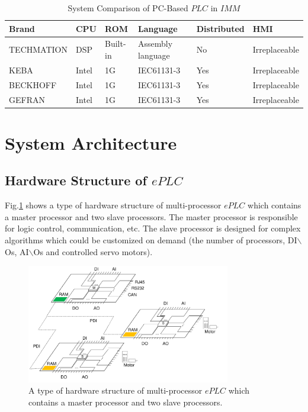 \documentclass[journal,UTF8]{IEEEtran}
\begin{document}
\begin{table}
	\scriptsize \caption{System Comparison of PC-Based $PLC$ in $IMM$}
	\label{table:IMMControllor}
	\begin{center}
		\renewcommand{\arraystretch}{1.4}
		\setlength\tabcolsep{3pt}
		\begin{tabular}{|p{1.6cm}|p{0.5cm}|p{0.8cm}|p{2cm}|p{1.1cm}|p{1.3cm}|}
			\hline
			Brand       & CPU    & ROM & Language       & Distributed  & HMI\\
			\hline
			TECHMATION  & DSP    & Built-in  & Assembly language        &No  & Irreplaceable \\
			\hline
			KEBA        & Intel  & 1G  & IEC61131-3                 &Yes    & Irreplaceable\\
			\hline
			BECKHOFF    & Intel  & 1G  & IEC61131-3               &Yes   &Irreplaceable\\
			\hline
			GEFRAN      & Intel  & 1G  &IEC61131-3                 &Yes   &Irreplaceable\\
			\hline
		\end{tabular}
	\end{center}
\end{table}
\section{System Architecture}
\label{MultiProcessorePLC}
\subsection{Hardware Structure of $ePLC$}
Fig.\ref{fig:HardwareStructure} shows a type of hardware structure of multi-processor $ePLC$ which contains a master processor and two slave processors. The master processor is responsible for logic control, communication, etc. The slave processor is designed for complex algorithms which could be customized on demand (the number of processors, DI$\backslash$Os, AI$\backslash$Os and controlled servo motors).
\begin{figure}
	\centering
	\includegraphics[width=3.5in]{fig/FIG2.pdf}
	\caption{ A type of hardware structure of multi-processor $ePLC$ which contains a master processor and two slave processors.}
	\label{fig:HardwareStructure}
\end{figure}
\end{document}
